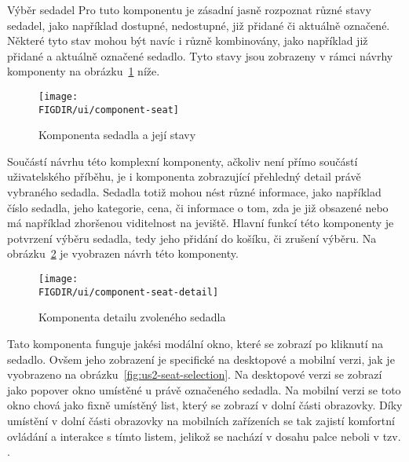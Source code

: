 \begin{subsection}{Výběr sedadel}
    Pro tuto komponentu je zásadní jasně rozpoznat různé stavy sedadel, jako například dostupné, nedostupné, již přidané či aktuálně označené.
    Některé tyto stav mohou být navíc i různě kombinovány, jako například již přidané a aktuálně označené sedadlo.
    Tyto stavy jsou zobrazeny v rámci návrhy komponenty  na obrázku~\ref{fig:component-seat} níže.

    \begin{figure}[H]
        \centering
        \caption{Komponenta sedadla a její stavy}
        \texttt{[image: \\FIGDIR/ui/component-seat]}
        \source{}
        \label{fig:component-seat}
    \end{figure}

    Součástí návrhu této komplexní komponenty, ačkoliv není přímo součástí uživatelského příběhu, je i komponenta zobrazující přehledný detail právě vybraného sedadla.
    Sedadla totiž mohou nést různé informace, jako například číslo sedadla, jeho kategorie, cena, či informace o tom, zda je již obsazené nebo má například zhoršenou viditelnost na jeviště.
    Hlavní funkcí této komponenty je potvrzení výběru sedadla, tedy jeho přidání do košíku, či zrušení výběru.
    Na obrázku~\ref{fig:component-seat-} je vyobrazen návrh této komponenty.

    \begin{figure}[H]
        \centering
        \caption{Komponenta detailu zvoleného sedadla}
        \texttt{[image: \\FIGDIR/ui/component-seat-detail]}
        \source{}
        \label{fig:component-seat-}
    \end{figure}

    Tato komponenta funguje jakési modální okno, které se zobrazí po kliknutí na sedadlo.
    Ovšem jeho zobrazení je specifické na desktopové a mobilní verzi, jak je vyobrazeno na obrázku~\ref{fig:us2-seat-selection}.
    Na desktopové verzi se zobrazí jako popover okno umístěné u právě označeného sedadla.
    Na mobilní verzi se toto okno chová jako fixně umístěný list, který se zobrazí v dolní části obrazovky.
    Díky umístění v dolní části obrazovky na mobilních zařízeních se tak zajistí komfortní ovládání a interakce s tímto listem, jelikož se nachází v dosahu palce neboli v tzv. .
\end{subsection}
\pagebreak

